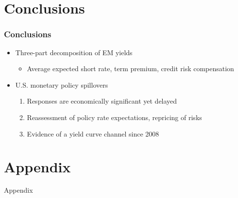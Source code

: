 \documentclass[12pt, aspectratio=169, xcolor=dvipsnames]{beamer}  %
\begin{document}
\section{Conclusions}

\begin{frame}
	\frametitle{Conclusions}
	\begin{itemize}
		\item Three-part decomposition of EM yields
		\begin{itemize}
			\item Average expected short rate, term premium, credit risk compensation
		\end{itemize}
		\item U.S. monetary policy spillovers
		\begin{enumerate}
			\item Responses are economically significant yet delayed
			\item Reassessment of policy rate expectations, repricing of risks
			\item Evidence of a yield curve channel since 2008
		\end{enumerate}
	\end{itemize}
\end{frame}


\section{Appendix}

\begin{frame}
	\begin{center}
		\huge \textcolor{yaleblue}{Appendix}
	\end{center}
\end{frame}
\end{document}
